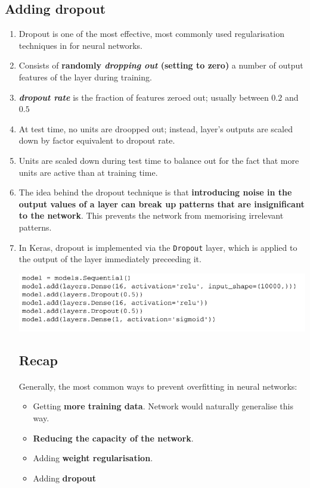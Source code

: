 \documentclass[12pt, a4paper]{article}
\begin{document}
\subsection{Adding dropout}
\begin{enumerate}
   \item Dropout is one of the most effective, most commonly used regularisation techniques in for neural networks.
   \item Consists of \textbf{randomly \textit{dropping out} (setting to zero)} a number of output features of the layer during training.
   \item \textbf{\textit{dropout rate}} is the fraction of features zeroed out; usually between $0.2$ and $0.5$
   \item At test time, no units are droopped out; instead, layer's outputs are scaled down by factor equivalent to dropout rate.
   \item Units are scaled down during test time to balance out for the fact that more units are active than at training time.
   \item The idea behind the dropout technique is that \textbf{introducing noise in the output values 
   of a layer can break up patterns that are insignificant to the network}. This prevents the network from 
   memorising irrelevant patterns.
   \item In Keras, dropout is implemented via the \lstinline{Dropout} layer,
   which is applied to the output of the layer immediately preceeding it.

   {
      \centering
      \includegraphics[width=13cm]{dropout_keras_implementation.png}

   }

\subsection{Recap}
\paragraph*{}
Generally, the most common ways to prevent overfitting in neural networks:
\begin{itemize}
   \item Getting \textbf{more training data}. Network would naturally generalise this way.
   \item \textbf{Reducing the capacity of the network}. 
   \item Adding \textbf{weight regularisation}.
   \item Adding \textbf{dropout}
\end{itemize}

\end{enumerate}
\end{document}
